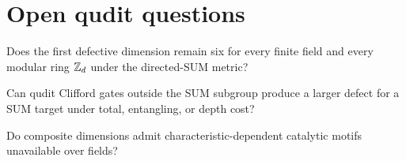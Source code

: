 \section{Open qudit questions}
\begin{question}
Does the first defective dimension remain six for every finite field and every modular ring $\mathbb Z_d$ under the directed-SUM metric?
\end{question}
\begin{question}
Can qudit Clifford gates outside the SUM subgroup produce a larger defect for a SUM target under total, entangling, or depth cost?
\end{question}
\begin{question}
Do composite dimensions admit characteristic-dependent catalytic motifs unavailable over fields?
\end{question}
